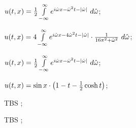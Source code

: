 	\begin{enumsols}

		\item \( u(t, x) = \frac{1}{2} \int\limits_{-\infty}^{\infty} e^{i \hat{\omega} x - \hat{\omega}^2 t - \left\vert \hat{\omega} \right\vert} ~ d\hat{\omega} \); \sfill %
		\item \( u(t, x) = 4 \int\limits_{-\infty}^{\infty} e^{i \hat{\omega} x - 4\hat{\omega}^2 t - \left\vert \hat{\omega} \right\vert} \cdot \frac{1}{16 \pi^2 + \hat{\omega}^2} ~ d\hat{\omega} \); \sfill %
		\item \( u(t, x) = \frac{1}{2} \int\limits_{-\infty}^{\infty} e^{i \hat{\omega} x - \hat{\omega}^2 t - \left\vert \hat{\omega} \right\vert} ~ d\hat{\omega}\); \sfill %
		\item \( u(t, x) = \sin{x} \cdot \left( 1 - t - \frac{1}{2} \cosh{t} \right) \); \sfill %

		\item TBS \( \); \sfill %
		\item TBS \( \); \sfill %

	\end{enumsols}
